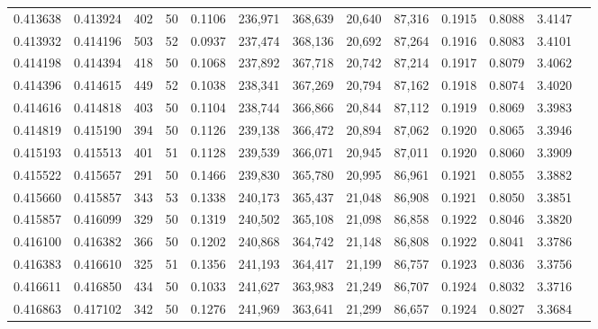 \begin{tabular}{rrrrrrrrrrrrr}
0.413638 & 0.413924 &   402 &  50 &                                     0.1106 & 236,971 & 368,639 &  20,640 &  87,316 & 0.1915 & 0.8088 & 3.4147 \\
0.413932 & 0.414196 &   503 &  52 &                                     0.0937 & 237,474 & 368,136 &  20,692 &  87,264 & 0.1916 & 0.8083 & 3.4101 \\
0.414198 & 0.414394 &   418 &  50 &                                     0.1068 & 237,892 & 367,718 &  20,742 &  87,214 & 0.1917 & 0.8079 & 3.4062 \\
0.414396 & 0.414615 &   449 &  52 &                                     0.1038 & 238,341 & 367,269 &  20,794 &  87,162 & 0.1918 & 0.8074 & 3.4020 \\
0.414616 & 0.414818 &   403 &  50 &                                     0.1104 & 238,744 & 366,866 &  20,844 &  87,112 & 0.1919 & 0.8069 & 3.3983 \\
0.414819 & 0.415190 &   394 &  50 &                                     0.1126 & 239,138 & 366,472 &  20,894 &  87,062 & 0.1920 & 0.8065 & 3.3946 \\
0.415193 & 0.415513 &   401 &  51 &                                     0.1128 & 239,539 & 366,071 &  20,945 &  87,011 & 0.1920 & 0.8060 & 3.3909 \\
0.415522 & 0.415657 &   291 &  50 &                                     0.1466 & 239,830 & 365,780 &  20,995 &  86,961 & 0.1921 & 0.8055 & 3.3882 \\
0.415660 & 0.415857 &   343 &  53 &                                     0.1338 & 240,173 & 365,437 &  21,048 &  86,908 & 0.1921 & 0.8050 & 3.3851 \\
0.415857 & 0.416099 &   329 &  50 &                                     0.1319 & 240,502 & 365,108 &  21,098 &  86,858 & 0.1922 & 0.8046 & 3.3820 \\
0.416100 & 0.416382 &   366 &  50 &                                     0.1202 & 240,868 & 364,742 &  21,148 &  86,808 & 0.1922 & 0.8041 & 3.3786 \\
0.416383 & 0.416610 &   325 &  51 &                                     0.1356 & 241,193 & 364,417 &  21,199 &  86,757 & 0.1923 & 0.8036 & 3.3756 \\
0.416611 & 0.416850 &   434 &  50 &                                     0.1033 & 241,627 & 363,983 &  21,249 &  86,707 & 0.1924 & 0.8032 & 3.3716 \\
0.416863 & 0.417102 &   342 &  50 &                                     0.1276 & 241,969 & 363,641 &  21,299 &  86,657 & 0.1924 & 0.8027 & 3.3684 \\

\end{tabular}
